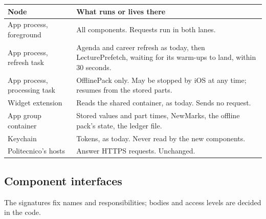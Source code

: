 \begin{center}\small
\begin{tabularx}{\linewidth}{@{}l X@{}}
  \toprule
  Node & What runs or lives there \\
  \midrule
  App process, foreground & All components. Requests run in both lanes. \\
  App process, refresh task & Agenda and career refresh as today, then LecturePrefetch, waiting for its warm-ups to land, within 30 seconds. \\
  App process, processing task & OfflinePack only. May be stopped by iOS at any time; resumes from the stored parts. \\
  Widget extension & Reads the shared container, as today. Sends no request. \\
  App group container & Stored values and part times, NewMarks, the offline pack's state, the ledger file. \\
  Keychain & Tokens, as today. Never read by the new components. \\
  Politecnico's hosts & Answer HTTPS requests. Unchanged. \\
  \bottomrule
\end{tabularx}
\end{center}

\subsection{Component interfaces}
The signatures fix names and responsibilities; bodies and access levels are decided
in the code.

